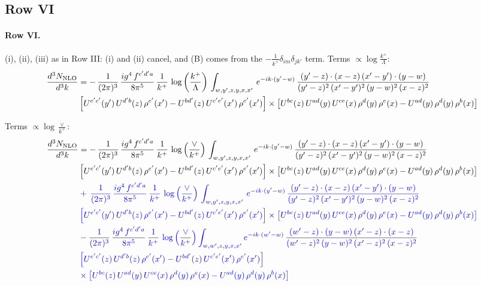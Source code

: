 \documentclass[10pt]{article}
\numberwithin{equation}{section}
\newcommand{\nc}{\color{blue}}
\begin{document}
\subsection{Row VI}
\paragraph{Row VI.}
(i), (ii), (iii) as in Row III: (i) and (ii) cancel, and (B) comes from the $-\frac{1}{k^+}\delta_{im}\delta_{jk'}$ term.
\noindent Terms $\propto\log\frac{k^+}{\Lambda}$:
\begin{align}
    \frac{d^{3}N_{\rm NLO}}{d^{3}k} & =    -\,\frac{1}{(2\pi)^{3}}\, \frac{ig^{4}\,f^{c'd'a}}{8\pi^{5}}\, \frac{1}{k^{+}}\,\log{\left(\frac{k^{+}}{\Lambda}\right)}\, \int_{w,y',z,y,x,x'}\, e^{-ik\cdot (y'-w)}\,\frac{(y'-z)\cdot (x-z)\,(x'-y')\cdot (y-w)}{(y'-z)^{2}\,(x'-y')^{2}\,(y-w)^{2}\,(x-z)^{2}}\notag \\ & \left[U^{e'c'}(y')\,U^{d'b}(z)\,\rho^{e'}(x')-U^{bd'}(z)\,U^{c'e'}(x')\,\rho^{e'}(x')\right]\times  \left[U^{bc}(z)\,U^{ad}(y)\,U^{ce}(x)\,\rho^{d}(y)\,\rho^{e}(x)-U^{ad}(y)\,\rho^{d}(y)\,\rho^{b}(x)\right] \label{eq:J:G3VI}
\end{align}

\noindent Terms $\propto\log\frac{\vee}{k^+}$:
\begin{align}
    \frac{d^{3}N_{\rm NLO}}{d^{3}k} & =    -\,\frac{1}{(2\pi)^{3}}\, \frac{ig^{4}\,f^{c'd'a}}{8\pi^{5}}\, \frac{1}{k^{+}}\,\log{\left(\frac{\vee}{k^{+}}\right)}\, \int_{w,y',z,y,x,x'}\, e^{-ik\cdot (y'-w)}\,\frac{(y'-z)\cdot (x-z)\,(x'-y')\cdot (y-w)}{(y'-z)^{2}\,(x'-y')^{2}\,(y-w)^{2}\,(x-z)^{2}}\notag \\ & \left[U^{e'c'}(y')\,U^{d'b}(z)\,\rho^{e'}(x')-U^{bd'}(z)\,U^{c'e'}(x')\,\rho^{e'}(x')\right]\times  \left[U^{bc}(z)\,U^{ad}(y)\,U^{ce}(x)\,\rho^{d}(y)\,\rho^{e}(x)-U^{ad}(y)\,\rho^{d}(y)\,\rho^{b}(x)\right] \notag \\
& \nc  +\,\frac{1}{(2\pi)^{3}}\, \frac{ig^{4}\,f^{c'd'a}}{8\pi^{5}}\, \frac{1}{k^{+}}\,\log{\left(\frac{\vee}{k^{+}}\right)}\, \int_{w,y',z,y,x,x'}\, e^{-ik\cdot (y'-w)}\,\frac{(y'-z)\cdot (x-z)\,(x'-y')\cdot (y-w)}{(y'-z)^{2}\,(x'-y')^{2}\,(y-w)^{2}\,(x-z)^{2}}\notag \\ & \nc  \left[U^{e'c'}(y')\,U^{d'b}(z)\,\rho^{e'}(x')-U^{bd'}(z)\,U^{c'e'}(x')\,\rho^{e'}(x')\right]\times  \left[U^{bc}(z)\,U^{ad}(y)\,U^{ce}(x)\,\rho^{d}(y)\,\rho^{e}(x)-U^{ad}(y)\,\rho^{d}(y)\,\rho^{b}(x)\right] \notag \\
& \nc  -\frac{1}{(2\pi)^{3}}\, \frac{ig^{4}\,f^{c'd'a}}{8\pi^{5}}\, \frac{1}{k^{+}}\,\log{\left(\frac{\vee}{k^{+}}\right)}\int_{w,w',z,y,x,x'} e^{-ik\cdot (w'-w)}\,\frac{(w'-z)\cdot (y-w)\,(x'-z)\cdot (x-z)}{(w'-z)^{2}\,(y-w)^{2}\,(x'-z)^{2}\,(x-z)^{2}}\notag \\
& \nc  \left[U^{e'c'}(z)\,U^{d'b}(z)\,\rho^{e'}(x')-U^{bd'}(z)\,U^{c'e'}(x')\,\rho^{e'}(x')\right]\notag \\
& \nc  \times\left[U^{bc}(z)\,U^{ad}(y)\,U^{ce}(x)\,\rho^{d}(y)\,\rho^{e}(x)-U^{ad}(y)\,\rho^{d}(y)\,\rho^{b}(x)\right] \label{eq:B:G3VI}
\end{align}
\end{document}
